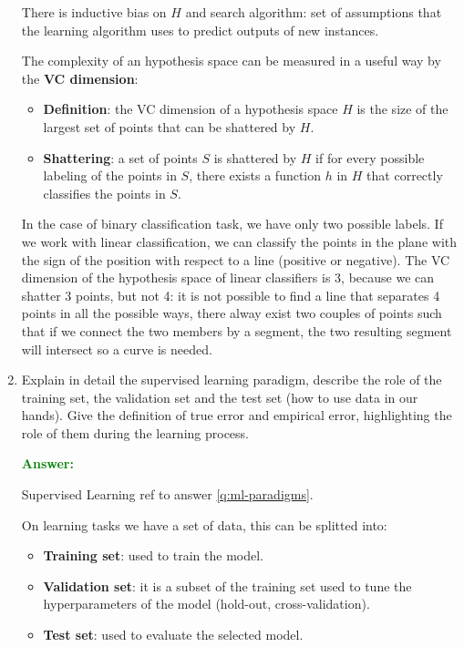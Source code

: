\documentclass[12pt]{article}
\begin{document}
\begin{enumerate}[label=\textbf{ML.\arabic*}]
    There is inductive bias on $H$ and search algorithm: set of assumptions that the learning algorithm uses to predict outputs of new instances.

    The complexity of an hypothesis space can be measured in a useful way by the \textbf{VC dimension}:
    \begin{itemize}
        \item \textbf{Definition}: the VC dimension of a hypothesis space $H$ is the size of the largest set of points that can be shattered by $H$.
        \item \textbf{Shattering}: a set of points $S$ is shattered by $H$ if for every possible labeling of the points in $S$, there exists a function $h$ in $H$ that correctly classifies the points in $S$.
    \end{itemize}
    In the case of binary classification task, we have only two possible labels.
    If we work with linear classification, we can classify the points in the plane with the sign of the position with respect to a line (positive or negative).
    The VC dimension of the hypothesis space of linear classifiers is 3, because we can shatter 3 points, but not 4:
    it is not possible to find a line that separates 4 points in all the possible ways, 
    there alway exist two couples of points such that if we connect the two members by a segment, 
    the two resulting segment will intersect so a curve is needed.

    \item Explain in detail the supervised learning paradigm, describe the role of the training set, the validation set and the test set (how to use data in our hands).
    Give the definition of true error and empirical error, highlighting the role of them during the learning process.

    \textcolor{green}{\textbf{Answer:}}

    Supervised Learning ref to answer \ref{q:ml-paradigms}.
    
    On learning tasks we have a set of data, this can be splitted into:
    \begin{itemize}
        \item \textbf{Training set}: used to train the model.
        \item \textbf{Validation set}: it is a subset of the training set used to tune the hyperparameters of the model (hold-out, cross-validation).
        \item \textbf{Test set}: used to evaluate the selected model.
    \end{itemize}


\end{enumerate}
\end{document}
